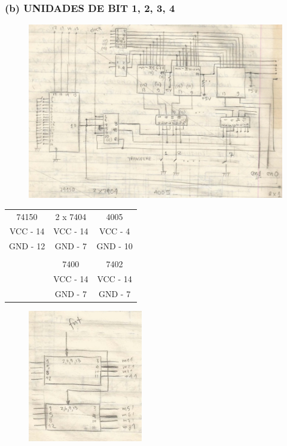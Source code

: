 \documentclass{article}
\begin{document}
\subsubsection{(b) UNIDADES DE BIT 1, 2, 3, 4}
\begin{figure}[H]
\centering
\includegraphics[width=12cm]{figuras/detalhamento dos blocos em nivel de ci - unidades de bit 1, 2, 3 e 4.png}
\end{figure}

\begin{tabular}{c c c}
74150 & 2 x 7404 & 4005 \\
VCC - 14 & VCC - 14 & VCC - 4 \\
GND - 12 & GND - 7 & GND - 10 \\
 & & \\
 & 7400 & 7402 \\
 & VCC - 14 &  VCC - 14 \\
 & GND - 7 &  GND - 7 \\
\end{tabular}

\begin{figure}[H]
\includegraphics[width=5cm]{figuras/detalhamento dos blocos em nivel de ci - unidades de bit 1, 2, 3 e 4 - parte 2.png}
\end{figure}
\end{document}
